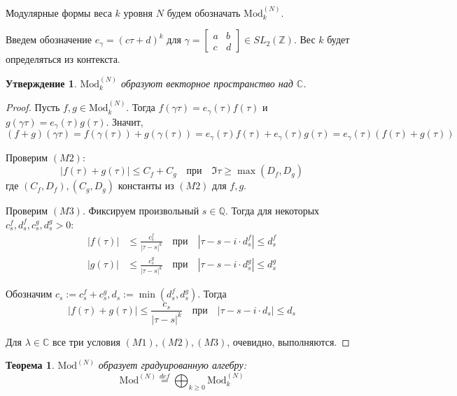 \documentclass{article}
\newcommand{\ZZ}{\mathbb{Z}}
\newcommand{\CC}{\mathbb{C}}
\newcommand{\QQ}{\mathbb{Q}}
\theoremstyle{break}
\newtheorem{theorem}{Теорема}[section]
\newtheorem{claim}{Утверждение}[section]
\newcommand{\ModkN}[2]{\text{Mod}_{#1}^{(#2)}}
\newcommand{\ModN}[1]{\text{Mod}^{(#1)}}
\begin{document}
Модулярные формы веса $k$ уровня $N$ будем обозначать $\ModkN{k}{N}$. 

Введем обозначение $e_\gamma=(c \tau + d)^k$ для $ \gamma = \begin{bmatrix}
	a & b \\ c & d \end{bmatrix}\in SL_2(\ZZ)$. Вес $k$ будет определяться из контекста.

\begin{claim}
	$\ModkN{k}{N}$ образуют векторное пространство над $\CC$.
\end{claim}
\begin{proof}
Пусть $f, g \in  \ModkN{k}{N}$. Тогда $f(\gamma \tau) = e_{\gamma}(\tau) f(\tau)$
и $g(\gamma \tau) = e_{\gamma}(\tau) g(\tau)$. Значит,
\begin{equation}
(f + g)(\gamma \tau) = f(\gamma(\tau)) + g(\gamma(\tau)) 
= e_\gamma(\tau)f(\tau) + e_\gamma(\tau)g(\tau)
= e_\gamma(\tau)(f(\tau) + g(\tau))
\end{equation}

Проверим $(M2)$: 
\begin{equation}
|f(\tau) + g(\tau)| \le C_f + C_g \quad \text{при} \quad 
\Im \tau \ge \max(D_f, D_g)
\end{equation}
где $(C_f, D_f), (C_g, D_g)$ константы из $(M2)$ для $f, g$.

Проверим $(M3)$. Фиксируем произвольный $s \in \QQ$. Тогда для некоторых 
$c_s^f, d_s^f, c_s^g, d_s^g > 0$:
\begin{align}
	|f(\tau)| &\le \frac{c_s^f}{|\tau - s|^k} \quad \text{при} \quad 
		|\tau - s - i \cdot d_s^f| \le d_s^f \\	
	|g(\tau)| &\le \frac{c_s^g}{|\tau - s|^k} \quad \text{при} \quad 
		|\tau - s - i \cdot d_s^g| \le d_s^g
\end{align}

Обозначим $c_s:=c_s^f + c_s^g, d_s:=\min(d_s^f, d_s^g)$. Тогда
\begin{equation}
	|f(\tau) + g(\tau)| \le \frac{c_s}{|\tau - s|^k} \quad \text{при} \quad
	|\tau - s - i \cdot d_s| \le d_s
\end{equation}


Для $\lambda \in \CC$ все три условия $(M1), (M2), (M3)$, очевидно, выполняются.


\end{proof}

\begin{theorem}
	$\ModN{N}$ образует градуированную алгебру:
	\begin{equation}
	\ModN{N} \stackrel{def}{=} \bigoplus_{k \ge 0} \ModkN{k}{N}
	\end{equation}
\end{theorem}
\end{document}
